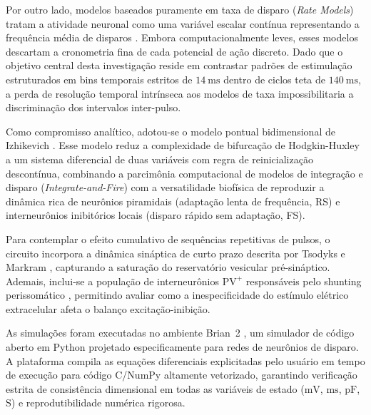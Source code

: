 \documentclass[11pt,a4paper,article,brazil]{abntex2}
\begin{document}
Por outro lado, modelos baseados puramente em taxa de disparo (\emph{Rate Models}) tratam a atividade neuronal como uma variável escalar contínua representando a frequência média de disparos \cite{dayan2001}. Embora computacionalmente leves, esses modelos descartam a cronometria fina de cada potencial de ação discreto. Dado que o objetivo central desta investigação reside em contrastar padrões de estimulação estruturados em bins temporais estritos de $\qty{14}{\milli\second}$ dentro de ciclos teta de $\qty{140}{\milli\second}$, a perda de resolução temporal intrínseca aos modelos de taxa impossibilitaria a discriminação dos intervalos inter-pulso.

Como compromisso analítico, adotou-se o modelo pontual bidimensional de Izhikevich \cite{izhikevich2003, izhikevich2007}. Esse modelo reduz a complexidade de bifurcação de Hodgkin-Huxley a um sistema diferencial de duas variáveis com regra de reinicialização descontínua, combinando a parcimônia computacional de modelos de integração e disparo (\emph{Integrate-and-Fire}) com a versatilidade biofísica de reproduzir a dinâmica rica de neurônios piramidais (adaptação lenta de frequência, RS) e interneurônios inibitórios locais (disparo rápido sem adaptação, FS).

Para contemplar o efeito cumulativo de sequências repetitivas de pulsos, o circuito incorpora a dinâmica sináptica de curto prazo descrita por Tsodyks e Markram \cite{tsodyks1997, tsodyks1998}, capturando a saturação do reservatório vesicular pré-sináptico. Ademais, inclui-se a população de interneurônios $\text{PV}^+$ responsáveis pelo shunting perissomático \cite{buzsaki2006}, permitindo avaliar como a inespecificidade do estímulo elétrico extracelular afeta o balanço excitação-inibição.

As simulações foram executadas no ambiente \textsf{Brian~2} \cite{stimberg2019}, um simulador de código aberto em Python projetado especificamente para redes de neurônios de disparo. A plataforma compila as equações diferenciais explicitadas pelo usuário em tempo de execução para código C/NumPy altamente vetorizado, garantindo verificação estrita de consistência dimensional em todas as variáveis de estado ($\unit{\milli\volt}$, $\unit{\milli\second}$, $\unit{\pico\farad}$, $\unit{\siemens}$) e reprodutibilidade numérica rigorosa.
\end{document}
